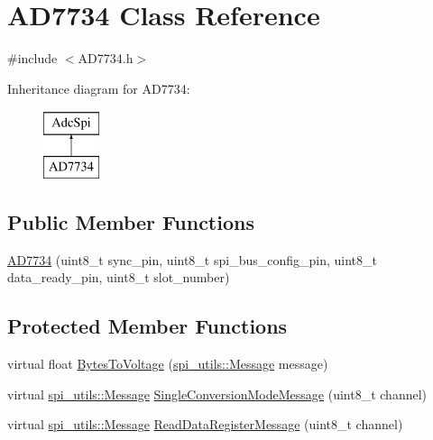 \hypertarget{classAD7734}{}\section{A\+D7734 Class Reference}
\label{classAD7734}


{\ttfamily \#include $<$A\+D7734.\+h$>$}

Inheritance diagram for A\+D7734\+:\begin{figure}[H]
\begin{center}
\leavevmode
\includegraphics[height=2.000000cm]{classAD7734}
\end{center}
\end{figure}
\subsection*{Public Member Functions}
\begin{DoxyCompactItemize}
\item 
\mbox{\hyperlink{classAD7734_a2bf3cea4357919fda364b8121cd6af4f}{A\+D7734}} (uint8\+\_\+t sync\+\_\+pin, uint8\+\_\+t spi\+\_\+bus\+\_\+config\+\_\+pin, uint8\+\_\+t data\+\_\+ready\+\_\+pin, uint8\+\_\+t slot\+\_\+number)
\end{DoxyCompactItemize}
\subsection*{Protected Member Functions}
\begin{DoxyCompactItemize}
\item 
virtual float \mbox{\hyperlink{classAD7734_a76b600d52392dbfe2d053e166af41018}{Bytes\+To\+Voltage}} (\mbox{\hyperlink{structspi__utils_1_1Message}{spi\+\_\+utils\+::\+Message}} message)
\item 
virtual \mbox{\hyperlink{structspi__utils_1_1Message}{spi\+\_\+utils\+::\+Message}} \mbox{\hyperlink{classAD7734_af677fbfbae0ec1c78b453ceb4a6736ec}{Single\+Conversion\+Mode\+Message}} (uint8\+\_\+t channel)
\item 
virtual \mbox{\hyperlink{structspi__utils_1_1Message}{spi\+\_\+utils\+::\+Message}} \mbox{\hyperlink{classAD7734_a6fa5e7c2bd8cde50dccb328d36f12516}{Read\+Data\+Register\+Message}} (uint8\+\_\+t channel)
\end{DoxyCompactItemize}


